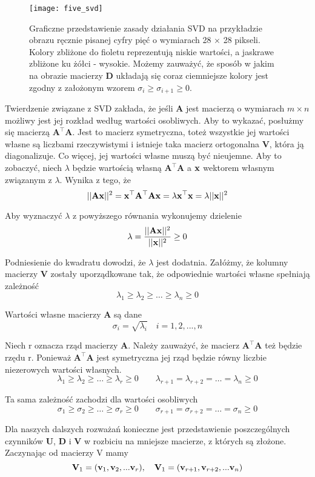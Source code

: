 \documentclass{article}
\begin{document}
\begin{figure}[h]
\centering
\texttt{[image: five\_svd]}
\caption{Graficzne przedstawienie zasady działania SVD na przykładzie obrazu ręcznie pisanej cyfry pięć o wymiarach 28 $\times$ 28 pikseli. Kolory zbliżone do fioletu reprezentują niskie wartości, a jaskrawe zbliżone ku żółci - wysokie. Możemy zauważyć, że sposób w jakim na obrazie macierzy $\mathbf{D}$ układają się coraz ciemniejsze kolory jest zgodny z założonym wzorem $\sigma_i \geq \sigma_{i+1} \geq 0$.}
\end{figure}

Twierdzenie związane z SVD zakłada, że jeśli $\mathbf{A}$ jest macierzą o wymiarach $m \times n$ możliwy jest jej rozkład według wartości osobliwych. Aby to wykazać, posłużmy się macierzą $\mathbf{A^\top A}$. Jest to macierz symetryczna, toteż wszystkie jej wartości własne są liczbami rzeczywistymi i istnieje taka macierz ortogonalna $\mathbf{V}$, która ją diagonalizuje. Co więcej, jej wartości własne muszą być nieujemne. Aby to zobaczyć, niech $\lambda$ będzie wartością własną $\mathbf{A^\top A}$ a $\vb{x}$ wektorem własnym związanym z $\lambda$. Wynika z tego, że
\[||\mathbf{A} \vb{x}||^2 = \vb{x}^\top \mathbf{A^\top A}\vb{x} = \lambda\vb{x}^\top \vb{x} = \lambda||\vb{x}||^2 \]

Aby wyznaczyć $\lambda$ z powyższego równania wykonujemy dzielenie
\[\lambda = \frac{||\mathbf{A}\vb{x}||^2}{||\vb{x}||^2} \geq 0 \]

Podniesienie do kwadratu dowodzi, że $\lambda$ jest dodatnia. Załóżmy, że kolumny macierzy $\mathbf{V}$ zostały uporządkowane tak, że odpowiednie wartości własne spełniają zależność
\[\lambda_1 \geq \lambda_2 \geq \ldots \geq \lambda_n \geq 0 \]

Wartości własne macierzy $\mathbf{A}$ są dane
\[\sigma_i = \sqrt{\lambda_i} \quad i = 1, 2,..., n \]

Niech r oznacza rząd macierzy $\mathbf{A}$. Należy zauważyć, że macierz $\mathbf{A^\top A}$ też będzie rzędu r. Ponieważ $\mathbf{A^\top A}$ jest symetryczna jej rząd będzie równy liczbie niezerowych wartości własnych.
\[\lambda_1 \geq \lambda_2 \geq \ldots \geq \lambda_r \geq 0 \qquad \lambda_{r+1} = \lambda_{r+2} = \ldots = \lambda_n \geq 0 \]

Ta sama zależność zachodzi dla wartości osobliwych
\[\sigma_1 \geq \sigma_2 \geq \ldots \geq \sigma_r \geq 0 \qquad \sigma_{r+1} = \sigma_{r+2} = \ldots = \sigma_n \geq 0 \]

Dla naszych dalszych rozważań konieczne jest przedstawienie poszczególnych czynników $\mathbf{U}$, $\mathbf{D}$ i $\mathbf{V}$ w rozbiciu na mniejsze macierze, z których są złożone. Zaczynając od macierzy V mamy
\[\mathbf{V}_1 = (\vb{v}_1, \vb{v}_2,... \vb{v}_r), \quad \mathbf{V}_1 = (\vb{v}_{r+1}, \vb{v}_{r+2},... \vb{v}_n) \]
\end{document}
